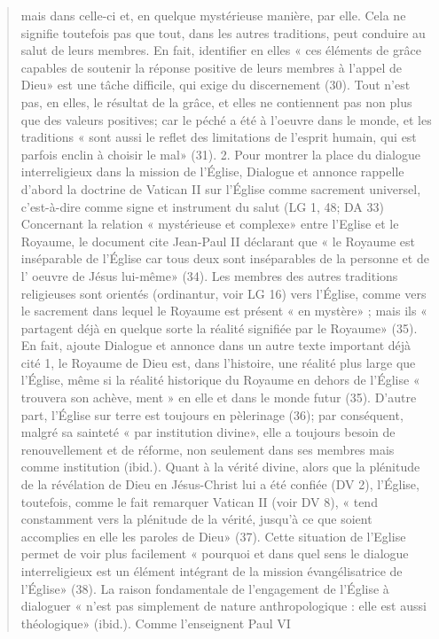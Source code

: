 \begin{quote}
mais dans celle-ci et, en quelque mystérieuse manière, par elle.
Cela ne signifie toutefois pas que tout, dans les autres traditions,
peut conduire au salut de leurs membres. En fait, identifier
en elles « ces éléments de grâce capables de soutenir la
réponse positive de leurs membres à l'appel de Dieu» est une
tâche difficile, qui exige du discernement (30). Tout n'est pas,
en elles, le résultat de la grâce, et elles ne contiennent pas non
plus que des valeurs positives; car le péché a été à l'oeuvre
dans le monde, et les traditions « sont aussi le reflet des limitations
de l'esprit humain, qui est parfois enclin à choisir le
mal» (31).
2. Pour montrer la place du dialogue interreligieux dans la
mission de l'Église, Dialogue et annonce rappelle d'abord la
doctrine de Vatican II sur l'Église comme sacrement universel,
c'est-à-dire comme signe et instrument du salut (LG 1, 48; DA 33)~ Concernant la relation « mystérieuse et complexe»
entre l'Eglise et le Royaume, le document cite Jean-Paul II
déclarant que « le Royaume est inséparable de l'Église car tous
deux sont inséparables de la personne et de l' oeuvre de Jésus
lui-même» (34). Les membres des autres traditions religieuses
sont orientés (ordinantur, voir LG 16) vers l'Église, comme
vers le sacrement dans lequel le Royaume est présent « en
mystère» ; mais ils « partagent déjà en quelque sorte la réalité
signifiée par le Royaume» (35).
En fait, ajoute Dialogue et annonce dans un autre texte
important déjà cité 1, le Royaume de Dieu est, dans l'histoire,
une réalité plus large que l'Église, même si la réalité historique
du Royaume en dehors de l'Église « trouvera son achève,
ment » en elle et dans le monde futur (35). D'autre part,
l'Église sur terre est toujours en pèlerinage (36); par conséquent,
malgré sa sainteté « par institution divine», elle a toujours
besoin de renouvellement et de réforme, non seulement
dans ses membres mais comme institution (ibid.). Quant à la
vérité divine, alors que la plénitude de la révélation de Dieu
en Jésus-Christ lui a été confiée (DV 2), l'Église, toutefois,
comme le fait remarquer Vatican II (voir DV 8), « tend
constamment vers la plénitude de la vérité, jusqu'à ce que
soient accomplies en elle les paroles de Dieu» (37).
Cette situation de l'Eglise permet de voir plus facilement
« pourquoi et dans quel sens le dialogue interreligieux est un
élément intégrant de la mission évangélisatrice de l'Église»
(38). La raison fondamentale de l'engagement de l'Église à
dialoguer « n'est pas simplement de nature anthropologique :
elle est aussi théologique» (ibid.). Comme l'enseignent Paul VI

\end{quote}

